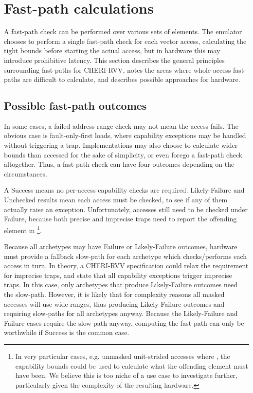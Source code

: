 \section{Fast-path calculations\label{chap:hardware:sec:fastpath}}
A fast-path check can be performed over various sets of elements.
The emulator chooses to perform a single fast-path check for each vector access, calculating the tight bounds before starting the actual access, but in hardware this may introduce prohibitive latency.
This section describes the general principles surrounding fast-paths for CHERI-RVV, notes the areas where whole-access fast-paths are difficult to calculate, and describes possible approaches for hardware.

\subsection{Possible fast-path outcomes}
In some cases, a failed address range check may not mean the access fails.
The obvious case is fault-only-first loads, where capability exceptions may be handled without triggering a trap.
Implementations may also choose to calculate wider bounds than accessed for the sake of simplicity, or even forego a fast-path check altogether.
Thus, a fast-path check can have four outcomes depending on the circumstances.

A Success means no per-access capability checks are required.
Likely-Failure and Unchecked results mean each access must be checked, to see if any of them actually raise an exception.
Unfortunately, accesses still need to be checked under Failure, because both precise and imprecise traps need to report the offending element in \footnote{In very particular cases, e.g. unmasked unit-strided accesses where , the capability bounds could be used to calculate what the offending element must have been. We believe this is too niche of a use case to investigate further, particularly given the complexity of the resulting hardware.}.

Because all archetypes may have Failure or Likely-Failure outcomes, hardware must provide a fallback slow-path for each archetype which checks/performs each access in turn.
In theory, a CHERI-RVV specification could relax the  requirement for imprecise traps, and state that all capability exceptions trigger imprecise traps.
In this case, only archetypes that produce Likely-Failure outcomes need the slow-path.
However, it is likely that for complexity reasons all masked accesses will use wide ranges, thus producing Likely-Failure outcomes and requiring slow-paths for all archetypes anyway.
Because the Likely-Failure and Failure cases require the slow-path anyway, computing the fast-path can only be worthwhile if Success is the common case.

